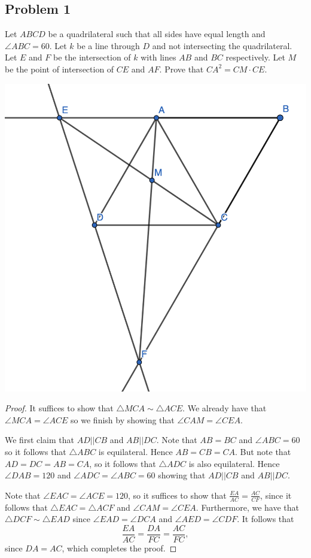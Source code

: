 \documentclass[12pt]{scrartcl}
\newcommand{\<}{\langle}
\renewcommand{\>}{\rangle}
\begin{document}
\subsection{Problem 1}
\begin{Prob}
Let $ABCD$ be a quadrilateral such that all sides have equal length and $\angle ABC = 60$.  Let $k$ be a line through $D$ and not intersecting the quadrilateral.  Let $E$ and $F$ be the intersection of $k$ with lines $AB$ and $BC$ respectively.  Let $M$ be the point of intersection of $CE$ and $AF$.  Prove that $CA^2 = CM \cdot CE$. 
\end{Prob}
\begin{center}
\includegraphics[scale=0.4]{graphics/hw1-1.png}
\end{center}
\begin{proof}
It suffices to show that $\triangle MCA \sim \triangle ACE$.  We already have that $\angle MCA = \angle ACE$ so we finish by showing that $\angle CAM = \angle CEA$.

We first claim that $AD || CB$ and $AB || DC$.  Note that $AB = BC$ and $\angle ABC = 60$ so it follows that $\triangle ABC$ is equilateral.  Hence $AB = CB = CA$.  But note that $AD = DC = AB = CA$, so it follows that $\triangle ADC$ is also equilateral.  Hence $\angle DAB = 120$ and $\angle ADC = \angle ABC = 60$ showing that $AD || CB$ and $AB || DC$.

Note that $\angle EAC = \angle ACE = 120$, so it suffices to show that $\frac{EA}{AC} = \frac{AC}{CF}$, since it follows that $\triangle EAC = \triangle ACF$ and $\angle CAM = \angle CEA$.  Furthermore, we have that $\triangle DCF \sim \triangle EAD$ since $\angle EAD = \angle DCA$ and $\angle AED = \angle CDF$.  It follows that 
$$\frac{EA}{AC} = \frac{DA}{FC} = \frac{AC}{FC},$$
since $DA = AC$, which completes the proof.
\end{proof}
\pagebreak
\end{document}
